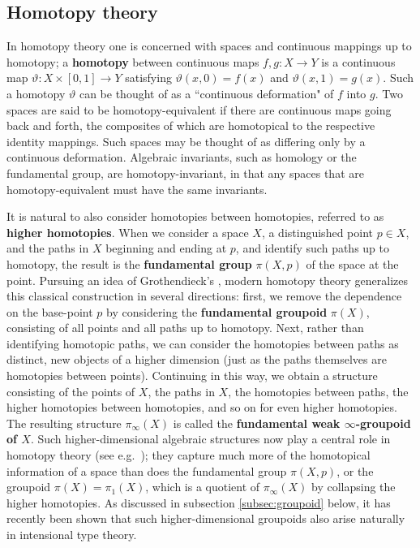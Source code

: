 \documentclass[reqno,12pt]{amsart}
\renewcommand{\to}{\rightarrow}
\newcommand{\myemph}[1]{\textbf{#1}}    %
\theoremstyle{definition}
\theoremstyle{remark}
\begin{document}
\subsection{Homotopy theory}

In homotopy theory one is concerned with spaces and continuous mappings up to homotopy; a \myemph{homotopy} between continuous maps $f,g:X \to Y$\/ is a continuous map $\vartheta:X \times [0,1] \to Y$\/ satisfying $\vartheta(x,0)=f(x)$\/ and $\vartheta(x,1)=g(x)$. Such a homotopy $\vartheta$ can be thought of as a ``continuous deformation" of $f$ into $g$. Two spaces are said to be homotopy-equivalent if there are continuous maps going back and forth, the composites of which are homotopical to the respective identity mappings.  Such spaces may be thought of as differing only by a continuous deformation.  Algebraic invariants, such as homology or the fundamental group, are homotopy-invariant, in that any spaces that are homotopy-equivalent must have the same invariants. 

It is natural to also consider homotopies between homotopies, referred to as \myemph{higher homotopies}.  When we consider a space $X$, a distinguished point $p\in X$, and the paths in $X$ beginning and ending at $p$, and identify such paths up to homotopy, the result is the \myemph{fundamental group} $\pi(X,p)$ of the space at the point.  Pursuing an idea of Grothendieck's \cite{Grothendieck:PS}, modern homotopy theory generalizes this classical construction in several directions: first, we remove the dependence on the base-point $p$ by considering the \myemph{fundamental groupoid} $\pi(X)$, consisting of all points and all paths up to homotopy.  Next, rather than identifying homotopic paths, we can consider the homotopies between paths as distinct, new objects of a higher dimension (just as the paths themselves are homotopies between points).  Continuing in this way, we obtain a structure consisting of the points of $X$, the paths in $X$, the homotopies between paths, the higher homotopies between homotopies, and so on for even higher homotopies.  The resulting structure $\pi_\infty(X)$ is called the \myemph{fundamental weak $\infty$-groupoid of $X$}.  Such higher-dimensional algebraic structures now play a central role in homotopy theory (see e.g.~\cite{Kapranov:OGHT}); they capture much more of the homotopical information of a space than does the fundamental group $\pi(X,p)$, or the groupoid $\pi(X)=\pi_1(X)$, which is a quotient of $\pi_\infty(X)$ by collapsing the higher homotopies.  As discussed in subsection \ref{subsec:groupoid} below, it has recently been shown that such higher-dimensional groupoids also arise naturally in intensional type theory.
\end{document}
